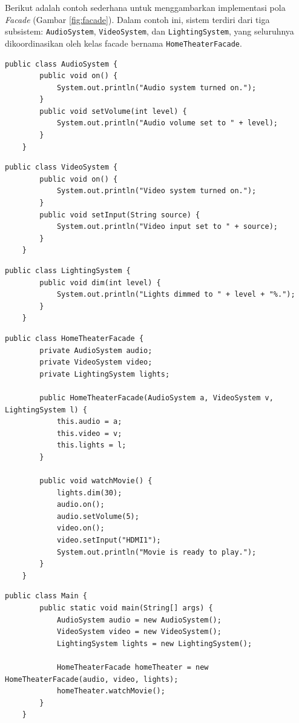Berikut adalah contoh sederhana untuk menggambarkan implementasi pola \textit{Facade} (Gambar \ref{fig:facade}). Dalam contoh ini, sistem terdiri dari tiga subsistem: \texttt{AudioSystem}, \texttt{VideoSystem}, dan \texttt{LightingSystem}, yang seluruhnya dikoordinasikan oleh kelas facade bernama \texttt{HomeTheaterFacade}.

\begin{lstlisting}[style=JavaStyle, caption={Subsistem: AudioSystem}]
	public class AudioSystem {
		public void on() {
			System.out.println("Audio system turned on.");
		}
		public void setVolume(int level) {
			System.out.println("Audio volume set to " + level);
		}
	}
\end{lstlisting}

\begin{lstlisting}[style=JavaStyle, caption={Subsistem: VideoSystem}]
	public class VideoSystem {
		public void on() {
			System.out.println("Video system turned on.");
		}
		public void setInput(String source) {
			System.out.println("Video input set to " + source);
		}
	}
\end{lstlisting}

\begin{lstlisting}[style=JavaStyle, caption={Subsistem: LightingSystem}]
	public class LightingSystem {
		public void dim(int level) {
			System.out.println("Lights dimmed to " + level + "%.");
		}
	}
\end{lstlisting}

\begin{lstlisting}[style=JavaStyle, caption={Facade: HomeTheaterFacade}]
	public class HomeTheaterFacade {
		private AudioSystem audio;
		private VideoSystem video;
		private LightingSystem lights;
		
		public HomeTheaterFacade(AudioSystem a, VideoSystem v, LightingSystem l) {
			this.audio = a;
			this.video = v;
			this.lights = l;
		}
		
		public void watchMovie() {
			lights.dim(30);
			audio.on();
			audio.setVolume(5);
			video.on();
			video.setInput("HDMI1");
			System.out.println("Movie is ready to play.");
		}
	}
\end{lstlisting}

\begin{lstlisting}[style=JavaStyle, caption={Client: Menggunakan Facade}]
	public class Main {
		public static void main(String[] args) {
			AudioSystem audio = new AudioSystem();
			VideoSystem video = new VideoSystem();
			LightingSystem lights = new LightingSystem();
			
			HomeTheaterFacade homeTheater = new HomeTheaterFacade(audio, video, lights);
			homeTheater.watchMovie();
		}
	}
\end{lstlisting}


